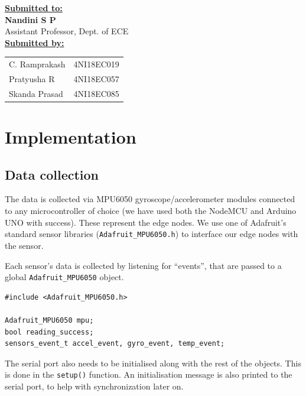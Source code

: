 \documentclass[a4paper,12pt]{report}
\begin{document}
\begin{titlepage}
\begin{center}
        \textbf{\underline{\large Submitted to:}} \\
        \textbf{\large Nandini S P} \\
        Assistant Professor, Dept. of ECE \\
        \vspace{1cm}
        \textbf{\underline{\large Submitted by:}} \\
        \vspace{0.5cm}
        \begin{tabular}[H]{l l}
            C. Ramprakash & 4NI18EC019 \\
            Pratyusha R & 4NI18EC057 \\
            Skanda Prasad & 4NI18EC085 \\
        \end{tabular}
    \end{center}
\end{titlepage}
\clearpage
\restoregeometry
\tableofcontents
\listoffigures
\listoflistings
\chapter{Implementation}
\section{Data collection}
The data is collected via MPU6050 gyroscope/accelerometer modules connected to
any microcontroller of choice (we have used both the NodeMCU and Arduino UNO
with success). These represent the edge nodes. We use one of Adafruit's
standard sensor libraries (\texttt{Adafruit_MPU6050.h}) to interface
our edge nodes with the sensor.
\par

Each sensor's data is collected by listening for ``events'', that are passed to
a global \texttt{Adafruit_MPU6050} object.

\begin{verbatim}
#include <Adafruit_MPU6050.h>

Adafruit_MPU6050 mpu;
bool reading_success;
sensors_event_t accel_event, gyro_event, temp_event;
\end{verbatim}

The serial port also needs to be initialised along with the rest of the
objects. This is done in the \texttt{setup()} function. An
initialisation message is also printed to the serial port, to help with
synchronization later on.
\end{document}

